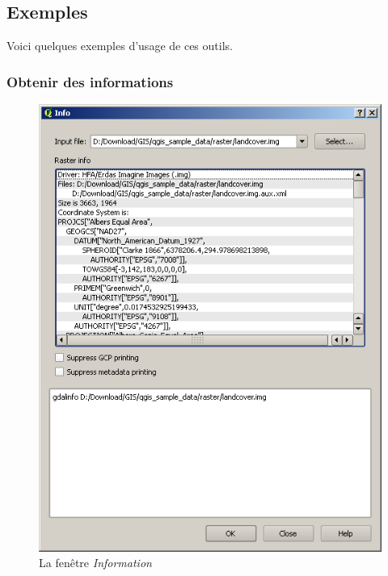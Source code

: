 {\subsection{Exemples}\label{gdal_examples}
Voici quelques exemples d'usage de ces outils.
\subsubsection{Obtenir des informations}
\begin{figure}[ht]
   \centering
   \caption{\label{gdalinfo}La fenêtre \emph{Information} \nixcaption}
   \includegraphics[clip=true, width=12cm]{plugins_gdaltools_images/gdalinfo}
\end{figure}

}
